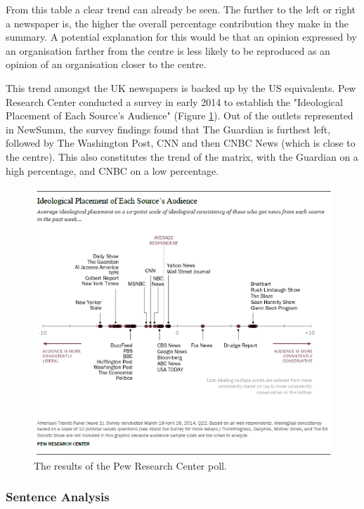 \documentclass[12pt]{article}
\begin{document}
From this table a clear trend can already be seen. The further to the left or right a newspaper is, the higher the overall percentage contribution they make in the summary. A potential explanation for this would be that an opinion expressed by an organisation farther from the centre is less likely to be reproduced as an opinion of an organisation closer to the centre. 

This trend amongst the UK newspapers is backed up by the US equivalents. Pew Research Center conducted a survey in early 2014 to establish the "Ideological Placement of Each Source's Audience" (Figure \ref{pewresearch}). Out of the outlets represented in NewSumm, the survey findings found that The Guardian is furthest left, followed by The Washington Post, CNN and then CNBC News (which is close to the centre). This also constitutes the trend of the matrix, with the Guardian on a high percentage, and CNBC on a low percentage.

\begin{figure}[ht!]
  \centering
    \includegraphics[scale=0.5]{pewresearch.png}
   \caption[A graph depicting responses to the User Interface Survey]{The results of the Pew Research Center poll.}
   \label{pewresearch}
\end{figure}

\subsubsection{Sentence Analysis}
\end{document}
